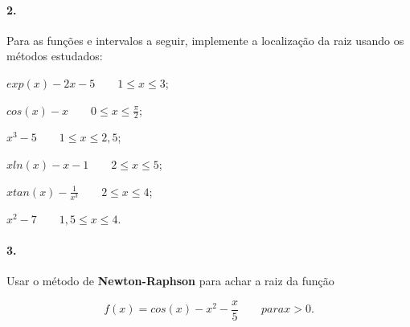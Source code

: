 \paragraph{2.} Para as funções e intervalos a seguir, implemente a localização da raiz
usando os métodos estudados:

\begin{enumerate}[a)]
	\begin{minipage}{0.5\textwidth}
	\item $exp(x) -2x -5\qquad 1\leq x\leq 3$;
	\item $cos(x)-x\qquad 0\leq x\leq\frac{\pi}{2}$; 
	\item $x^3-5\qquad 1\leq x \leq 2,5$;
	\end{minipage}
	\begin{minipage}{0.5\textwidth}
	\item $xln(x)-x-1\qquad 2\leq x\leq 5 $;
	\item $xtan(x)-\frac{1}{x^3}\qquad 2\leq x\leq 4$;
	\item $x^2-7\qquad 1,5\leq x\leq 4$.
	\end{minipage}
\end{enumerate}

\paragraph{3.} Usar o método de {\bf Newton-Raphson} para achar
a raiz da função 

\begin{equation}
	f(x) = cos(x) - x^2 - \frac{x}{5}\qquad para x>0.
\end{equation}
